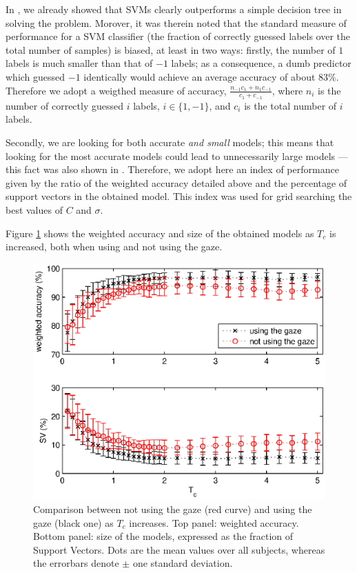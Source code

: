 In \cite{clea07}, we already showed that SVMs clearly outperforms a
simple decision tree in solving the problem. Morover, it was therein
noted that the standard measure of performance for a SVM classifier
(the fraction of correctly guessed labels over the total number of
samples) is biased, at least in two ways: firstly, the number of $1$
labels is much smaller than that of $-1$ labels; as a consequence, a
dumb predictor which guessed $-1$ identically would achieve an average
accuracy of about $83\%$. Therefore we adopt a weigthed measure of
accuracy, $\frac{n_{-1} c_1 + n_1 c_{-1}}{c_1+c_{-1}}$, where $n_i$ is
the number of correctly guessed $i$ labels, $i \in \{1,-1\}$, and
$c_i$ is the total number of $i$ labels.

Secondly, we are looking for both accurate \emph{and small} models;
this means that looking for the most accurate models could lead to
unnecessarily large models --- this fact was also shown in
\cite{clea07}. Therefore, we adopt here an index of performance given
by the ratio of the weighted accuracy detailed above and the
percentage of support vectors in the obtained model. This index was
used for grid searching the best values of $C$ and $\sigma$.

Figure \ref{fig:comparison} shows the weighted accuracy and size of
the obtained models as $T_c$ is increased, both when using and not
using the gaze.

\begin{figure}[!ht]
  \centering
    \includegraphics[width=\linewidth]{figs/comparison.eps}
    \caption{Comparison between not using the gaze (red curve) and
    using the gaze (black one) as $T_c$ increases. Top panel: weighted
    accuracy. Bottom panel: size of the models, expressed as the
    fraction of Support Vectors. Dots are the mean values over all
    subjects, whereas the errorbars denote $\pm$ one standard deviation.}
    \label{fig:comparison}
\end{figure}

